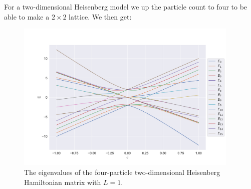 For a two-dimensional Heisenberg model we up the particle count to four to be able to make a $2\times 2$ lattice. We then get:


\begin{figure}[H]
  \begin{center}
    \includegraphics[width=0.95\textwidth]{Figures/Plots/Heisen/heisen_eig_22}
  \end{center}
  \caption{The eigenvalues of the four-particle two-dimensional Heisenberg Hamiltonian matrix with $L = 1$.}
\end{figure}


